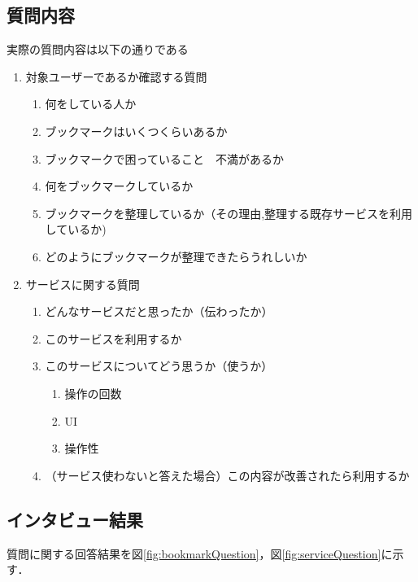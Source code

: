 \documentclass[a4paper,10pt,fleqn]{jsarticle}
\begin{document}
\subsection{質問内容}
実際の質問内容は以下の通りである
\begin{enumerate}
  \item 対象ユーザーであるか確認する質問
  \begin{enumerate}
    \item 何をしている人か
    \item ブックマークはいくつくらいあるか
    \item ブックマークで困っていること　不満があるか
    \item 何をブックマークしているか
    \item ブックマークを整理しているか（その理由,整理する既存サービスを利用しているか)
    \item どのようにブックマークが整理できたらうれしいか
  \end{enumerate}
  \item サービスに関する質問
  \begin{enumerate}
    \item どんなサービスだと思ったか（伝わったか）
    \item このサービスを利用するか
    \item このサービスについてどう思うか（使うか）
    \begin{enumerate}
      \item 操作の回数
      \item UI
      \item 操作性
    \end{enumerate}
    \item （サービス使わないと答えた場合）この内容が改善されたら利用するか
  \end{enumerate}
\end{enumerate}
\subsection{インタビュー結果}
質問に関する回答結果を図\ref{fig:bookmarkQuestion}，図\ref{fig:serviceQuestion}に示す．
\end{document}
